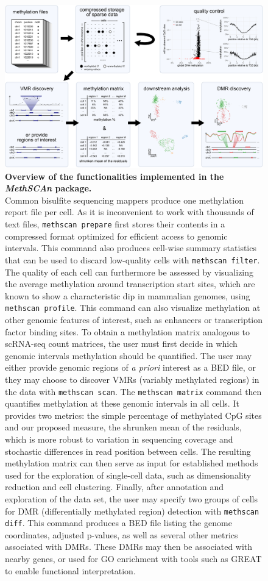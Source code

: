 \documentclass[10pt]{article}
\begin{document}
\begin{figure}[p]
	\begin{center}
		\includegraphics[width=.8\textwidth]{figures/Fig_workflow.png}
	\end{center}
	\caption{\small \textbf{Overview of the functionalities implemented in the \textit{MethSCAn} package.}\\
		Common bisulfite sequencing mappers produce one methylation report file per cell.
		As it is inconvenient to work with thousands of text files, \texttt{methscan prepare} first stores their contents in a compressed format optimized for efficient access to genomic intervals.
		This command also produces cell-wise summary statistics that can be used to discard low-quality cells with \texttt{methscan filter}.
		The quality of each cell can furthermore be assessed by visualizing the average methylation around transcription start sites, which are known to show a characteristic dip in mammalian genomes, using \texttt{methscan profile}.
		This command can also visualize methylation at other genomic features of interest, such as enhancers or transcription factor binding sites.
		To obtain a methylation matrix analogous to scRNA-seq count matrices, the user must first decide in which genomic intervals methylation should be quantified.
		The user may either provide genomic regions of \emph{a priori} interest as a BED file, or they may choose to discover VMRs (variably methylated regions) in the data with \texttt{methscan scan}.
		The \texttt{methscan matrix} command then quantifies methylation at these genomic intervals in all cells.
		It provides two metrics:
		the simple percentage of methylated CpG sites and our proposed measure, the shrunken mean of the residuals, which is more robust to variation in sequencing coverage and stochastic differences in read position between cells.
		The resulting methylation matrix can then serve as input for established methods used for the exploration of single-cell data, such as dimensionality reduction and cell clustering.
		Finally, after annotation and exploration of the data set, the user may specify two groups of cells for DMR (differentially methylated region) detection with \texttt{methscan diff}.
		This command produces a BED file listing the genome coordinates, adjusted p-values, as well as several other metrics associated with DMRs.
		These DMRs may then be associated with nearby genes, or used for GO enrichment with tools such as GREAT \citep{mclean2010great} to enable functional interpretation.
	}
	\label{fig:workflow}
\end{figure}
\end{document}

